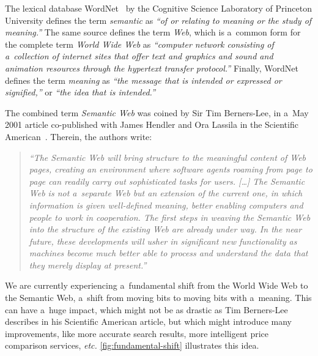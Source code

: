 The lexical database
WordNet~\cite{fellbaum1998wordnet,miller1995wordnet}
by the Cognitive Science Laboratory
of Princeton University defines the term \emph{semantic}
as \emph{``of or relating to meaning or the study of meaning.''}
The same source defines the term \emph{Web},
which is a~common form for the complete term
\emph{World Wide Web} as
\emph{``computer network consisting of a~collection of internet sites that offer text and graphics and
sound and animation resources through the hypertext
transfer protocol.''}
Finally, WordNet defines the term \emph{meaning}
as \emph{``the message that is intended or expressed
or signified,''} or \emph{``the idea that is intended.''}

The combined term \emph{Semantic Web} was coined
by Sir Tim Berners-Lee,
in a~May 2001 article co-published with James Hendler
and Ora Lassila
in the Scientific American~\cite{bernerslee2001semanticweb}.
Therein, the authors write:

\begin{quotation}
\textit{``The Semantic Web will bring structure to the meaningful
content of Web pages,
creating an environment where software agents
roaming from page to page
can readily carry out sophisticated tasks for users. [\ldots]
The Semantic Web is not a~separate Web
but an extension of the current one,
in which information is given well-defined meaning,
better enabling computers and people
to work in cooperation.
The first steps in weaving the Semantic Web
into the structure of the existing Web
are already under way.
In the near future, these developments
will usher in significant new functionality
as machines become much better able to process and \emph{understand} the data
that they merely display at present.''}
\end{quotation}

We are currently experiencing a~fundamental shift
from the World Wide Web to the Semantic Web,
a~shift from moving bits to moving bits with a~meaning.
This can have a~huge impact,
which might not be as drastic as Tim Berners-Lee describes
in his Scientific American article,
but which might introduce many improvements,
like more accurate search results,
more intelligent price comparison services, \emph{etc.}
\autoref{fig:fundamental-shift} illustrates this idea.

